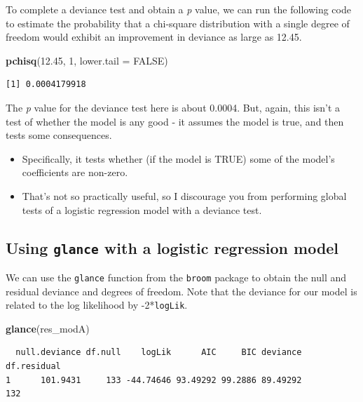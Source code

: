 \documentclass[]{book}
\newenvironment{Shaded}{\begin{snugshade}}{\end{snugshade}}
\newcommand{\KeywordTok}[1]{\textcolor[rgb]{0.13,0.29,0.53}{\textbf{#1}}}
\newcommand{\DataTypeTok}[1]{\textcolor[rgb]{0.13,0.29,0.53}{#1}}
\newcommand{\DecValTok}[1]{\textcolor[rgb]{0.00,0.00,0.81}{#1}}
\newcommand{\FloatTok}[1]{\textcolor[rgb]{0.00,0.00,0.81}{#1}}
\newcommand{\OtherTok}[1]{\textcolor[rgb]{0.56,0.35,0.01}{#1}}
\newcommand{\NormalTok}[1]{#1}
\providecommand{\tightlist}{%
  \setlength{\itemsep}{0pt}\setlength{\parskip}{0pt}}
\theoremstyle{definition}
\theoremstyle{definition}
\theoremstyle{definition}
\theoremstyle{remark}
\begin{document}
To complete a deviance test and obtain a \emph{p} value, we can run the
following code to estimate the probability that a chi-square
distribution with a single degree of freedom would exhibit an
improvement in deviance as large as 12.45.

\begin{Shaded}
\begin{Highlighting}[]
\KeywordTok{pchisq}\NormalTok{(}\FloatTok{12.45}\NormalTok{, }\DecValTok{1}\NormalTok{, }\DataTypeTok{lower.tail =} \OtherTok{FALSE}\NormalTok{)}
\end{Highlighting}
\end{Shaded}

\begin{verbatim}
[1] 0.0004179918
\end{verbatim}

The \emph{p} value for the deviance test here is about 0.0004. But,
again, this isn't a test of whether the model is any good - it assumes
the model is true, and then tests some consequences.

\begin{itemize}
\tightlist
\item
  Specifically, it tests whether (if the model is TRUE) some of the
  model's coefficients are non-zero.
\item
  That's not so practically useful, so I discourage you from performing
  global tests of a logistic regression model with a deviance test.
\end{itemize}

\subsection{\texorpdfstring{Using \texttt{glance} with a logistic
regression
model}{Using glance with a logistic regression model}}\label{using-glance-with-a-logistic-regression-model}

We can use the \texttt{glance} function from the \texttt{broom} package
to obtain the null and residual deviance and degrees of freedom. Note
that the deviance for our model is related to the log likelihood by
-2*\texttt{logLik}.

\begin{Shaded}
\begin{Highlighting}[]
\KeywordTok{glance}\NormalTok{(res_modA)}
\end{Highlighting}
\end{Shaded}

\begin{verbatim}
  null.deviance df.null    logLik      AIC     BIC deviance df.residual
1      101.9431     133 -44.74646 93.49292 99.2886 89.49292         132
\end{verbatim}
\end{document}
